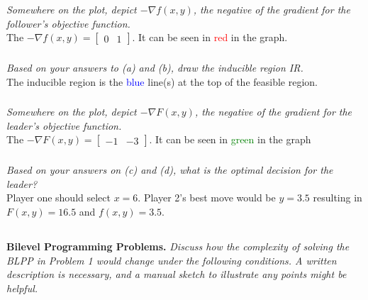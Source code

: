 \documentclass[12pt]{amsart}
\begin{document}
\subsubsection{}
\textit{Somewhere on the plot, depict $-\nabla f(x,y)$, the negative of the gradient for the follower’s objective function.} \\

	The $-\nabla f(x,y) = \begin{bmatrix} 0 & 1 \end{bmatrix}$. It can be seen in \textcolor{red}{red} in the graph.

\subsubsection{}
\textit{Based on your answers to (a) and (b), draw the inducible region IR.} \\
	
	The inducible region is the \textcolor{blue}{blue} line(s) at the top of the feasible region.
		
\subsubsection{}
\textit{Somewhere on the plot, depict $-\nabla F(x,y)$, the negative of the gradient for the leader’s objective function.} \\
	
	The $-\nabla F(x,y) = \begin{bmatrix} -1 & -3 \end{bmatrix}$. It can be seen in \textcolor{green}{green} in the graph
	
\subsubsection{}
\textit{Based on your answers on (c) and (d), what is the optimal decision for the leader?} \\

	Player one should select $x=6$. Player 2's best move would be $y=3.5$ resulting in $F(x,y) = 16.5$ and $f(x,y) = 3.5$. 
	
\clearpage

\subsection{}
\textbf{Bilevel Programming Problems.} 
\textit{Discuss how the complexity of solving the BLPP in Problem 1 would change under the following conditions. A written description is necessary, and a manual sketch to illustrate any points might be helpful.}
\end{document}
